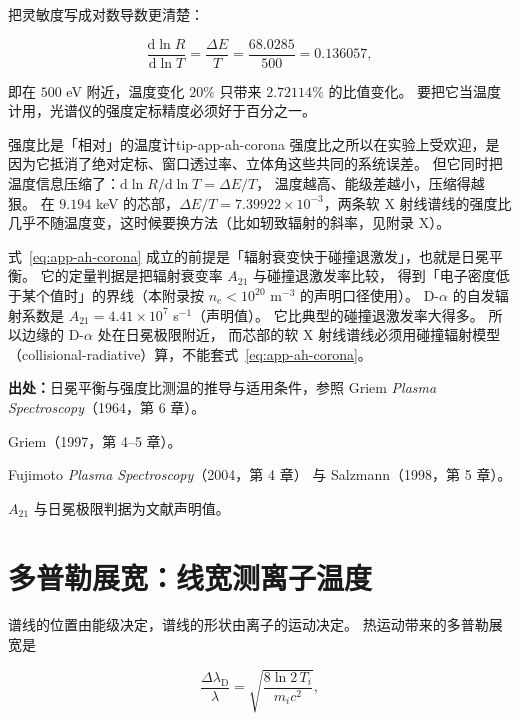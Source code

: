 把灵敏度写成对数导数更清楚：

\begin{equation}
\frac{\mathrm{d}\ln R}{\mathrm{d}\ln T} = \frac{\Delta E}{T}
  = \frac{68.0285}{500} = 0.136057,
\label{eq:app-ah-sens}
\end{equation}

即在 $500$ eV 附近，温度变化 $20\%$ 只带来 $2.72114\%$ 的比值变化。
要把它当温度计用，光谱仪的强度定标精度必须好于百分之一。

\begin{tip}{强度比是「相对」的温度计}{tip-app-ah-corona}
强度比之所以在实验上受欢迎，是因为它抵消了绝对定标、窗口透过率、立体角这些共同的系统误差。
但它同时把温度信息压缩了：$\mathrm{d}\ln R/\mathrm{d}\ln T = \Delta E/T$，
温度越高、能级差越小，压缩得越狠。
在 $9.194$ keV 的芯部，$\Delta E/T = 7.39922\times10^{-3}$，两条软 X 射线谱线的强度比几乎不随温度变，这时候要换方法（比如轫致辐射的斜率，见附录 X）。
\end{tip}

式~\eqref{eq:app-ah-corona} 成立的前提是「辐射衰变快于碰撞退激发」，也就是日冕平衡。
它的定量判据是把辐射衰变率 $A_{21}$ 与碰撞退激发率比较，
得到「电子密度低于某个值时」的界线（本附录按 $n_e<10^{20}$ m$^{-3}$ 的声明口径使用）。
D-$\alpha$ 的自发辐射系数是 $A_{21}=4.41\times10^{7}$ s$^{-1}$（声明值）。
它比典型的碰撞退激发率大得多。
所以边缘的 D-$\alpha$ 处在日冕极限附近，
而芯部的软 X 射线谱线必须用碰撞辐射模型（collisional-radiative）算，不能套式~\eqref{eq:app-ah-corona}。

{\footnotesize
\textbf{出处：}日冕平衡与强度比测温的推导与适用条件，参照 Griem \emph{Plasma Spectroscopy}（1964，第 6 章）。

Griem（1997，第 4--5 章）。

Fujimoto \emph{Plasma Spectroscopy}（2004，第 4 章）
与 Salzmann（1998，第 5 章）。

$A_{21}$ 与日冕极限判据为文献声明值。
}

\section{多普勒展宽：线宽测离子温度}
\label{sec:app-ah-doppler}

谱线的位置由能级决定，谱线的形状由离子的运动决定。
热运动带来的多普勒展宽是

\begin{equation}
\frac{\Delta\lambda_{\mathrm{D}}}{\lambda}
  = \sqrt{\frac{8\ln 2\,T_i}{m_i c^2}},
\label{eq:app-ah-doppler}
\end{equation}

